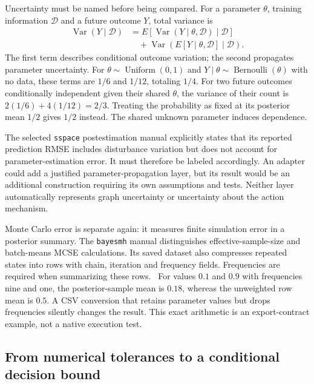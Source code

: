 Uncertainty must be named before being compared. For a parameter $\theta$,
training information $\mathcal D$ and a future outcome $Y$, total variance is
\begin{equation}
\begin{aligned}
 \operatorname{Var}(Y\mid\mathcal D)
 &=E[\operatorname{Var}(Y\mid\theta,\mathcal D)\mid\mathcal D]\\
 &\quad+\operatorname{Var}(E[Y\mid\theta,\mathcal D]\mid\mathcal D).
\end{aligned}
\label{exec22:state-variance}
\end{equation}
The first term describes conditional outcome variation; the second propagates
parameter uncertainty. For $\theta\sim\operatorname{Uniform}(0,1)$ and
$Y\mid\theta\sim\operatorname{Bernoulli}(\theta)$ with no data, these terms
are $1/6$ and $1/12$, totaling $1/4$. For two future outcomes conditionally
independent given their shared $\theta$, the variance of their count is
$2(1/6)+4(1/12)=2/3$. Treating the probability as fixed at its posterior mean
$1/2$ gives $1/2$ instead. The shared unknown parameter induces dependence.
\citep{exec22_state_reference}

The selected \texttt{sspace} postestimation manual explicitly states that its
reported prediction RMSE includes disturbance variation but does not account
for parameter-estimation error. It must therefore be labeled accordingly.
An adapter could add a justified parameter-propagation layer, but its result
would be an additional construction requiring its own assumptions and tests.
Neither layer automatically represents graph uncertainty or uncertainty about
the action mechanism.~\citep{exec22_state_stata_sspace_post}

Monte Carlo error is separate again: it measures finite simulation error in a
posterior summary. The \texttt{bayesmh} manual distinguishes effective-sample-size
and batch-means MCSE calculations. Its saved dataset also compresses repeated
states into rows with chain, iteration and frequency fields. Frequencies are
required when summarizing these rows.~\citep{exec22_state_stata_bayesmh}
For values $0.1$ and $0.9$ with frequencies nine and one, the posterior-sample
mean is $0.18$, whereas the unweighted row mean is $0.5$. A CSV conversion that
retains parameter values but drops frequencies silently changes the result.
This exact arithmetic is an export-contract example, not a native execution
test.~\citep{exec22_state_reference}

\subsection{From numerical tolerances to a conditional decision bound}
\label{exec22:state-approximation}


